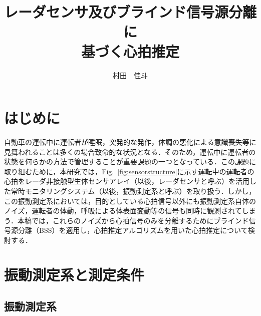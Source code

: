 \documentclass[a4j]{jsarticle}
\title{レーダセンサ及びブラインド信号源分離に\\基づく心拍推定}
\author{村田　佳斗}
\begin{document}
\maketitle%



\thispagestyle{empty}
\pagestyle{empty}

\section{はじめに}

自動車の運転中に運転者が睡眠，突発的な発作，体調の悪化による意識喪失等に見舞われることは多くの場合致命的な状況となる．そのため，運転中に運転者の状態を何らかの方法で管理することが重要課題の一つとなっている．この課題に取り組むために，本研究では，Fig.~\ref{fig:sensorstructure}に示す運転中の運転者の心拍をレーダ非接触型生体センサアレイ（以後，レーダセンサと呼ぶ）を活用した常時モニタリングシステム（以後，振動測定系と呼ぶ）を取り扱う．しかし，この振動測定系においては，目的としている心拍信号以外にも振動測定系自体のノイズ，運転者の体動，呼吸による体表面変動等の信号も同時に観測されてしまう．本稿では，これらのノイズから心拍信号のみを分離するためにブラインド信号源分離（BSS）\cite{originica, ica2}を適用し，心拍推定アルゴリズムを用いた心拍推定について検討する．

\section{振動測定系と測定条件}

\subsection{振動測定系}
\end{document}

